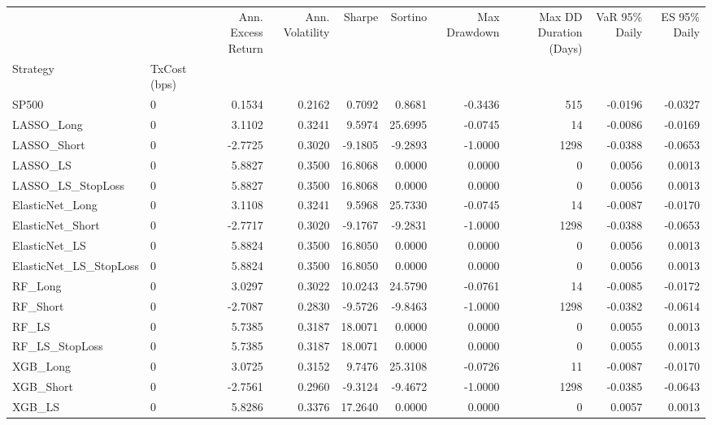 \begin{tabular}{llrrrrrrrr}
\toprule
 &  & Ann. Excess Return & Ann. Volatility & Sharpe & Sortino & Max Drawdown & Max DD Duration (Days) & VaR 95\% Daily & ES 95\% Daily \\
Strategy & TxCost (bps) &  &  &  &  &  &  &  &  \\
\midrule
SP500 & 0 & 0.1534 & 0.2162 & 0.7092 & 0.8681 & -0.3436 & 515 & -0.0196 & -0.0327 \\
\cline{1-10}
LASSO\_Long & 0 & 3.1102 & 0.3241 & 9.5974 & 25.6995 & -0.0745 & 14 & -0.0086 & -0.0169 \\
\cline{1-10}
LASSO\_Short & 0 & -2.7725 & 0.3020 & -9.1805 & -9.2893 & -1.0000 & 1298 & -0.0388 & -0.0653 \\
\cline{1-10}
LASSO\_LS & 0 & 5.8827 & 0.3500 & 16.8068 & 0.0000 & 0.0000 & 0 & 0.0056 & 0.0013 \\
\cline{1-10}
LASSO\_LS\_StopLoss & 0 & 5.8827 & 0.3500 & 16.8068 & 0.0000 & 0.0000 & 0 & 0.0056 & 0.0013 \\
\cline{1-10}
ElasticNet\_Long & 0 & 3.1108 & 0.3241 & 9.5968 & 25.7330 & -0.0745 & 14 & -0.0087 & -0.0170 \\
\cline{1-10}
ElasticNet\_Short & 0 & -2.7717 & 0.3020 & -9.1767 & -9.2831 & -1.0000 & 1298 & -0.0388 & -0.0653 \\
\cline{1-10}
ElasticNet\_LS & 0 & 5.8824 & 0.3500 & 16.8050 & 0.0000 & 0.0000 & 0 & 0.0056 & 0.0013 \\
\cline{1-10}
ElasticNet\_LS\_StopLoss & 0 & 5.8824 & 0.3500 & 16.8050 & 0.0000 & 0.0000 & 0 & 0.0056 & 0.0013 \\
\cline{1-10}
RF\_Long & 0 & 3.0297 & 0.3022 & 10.0243 & 24.5790 & -0.0761 & 14 & -0.0085 & -0.0172 \\
\cline{1-10}
RF\_Short & 0 & -2.7087 & 0.2830 & -9.5726 & -9.8463 & -1.0000 & 1298 & -0.0382 & -0.0614 \\
\cline{1-10}
RF\_LS & 0 & 5.7385 & 0.3187 & 18.0071 & 0.0000 & 0.0000 & 0 & 0.0055 & 0.0013 \\
\cline{1-10}
RF\_LS\_StopLoss & 0 & 5.7385 & 0.3187 & 18.0071 & 0.0000 & 0.0000 & 0 & 0.0055 & 0.0013 \\
\cline{1-10}
XGB\_Long & 0 & 3.0725 & 0.3152 & 9.7476 & 25.3108 & -0.0726 & 11 & -0.0087 & -0.0170 \\
\cline{1-10}
XGB\_Short & 0 & -2.7561 & 0.2960 & -9.3124 & -9.4672 & -1.0000 & 1298 & -0.0385 & -0.0643 \\
\cline{1-10}
XGB\_LS & 0 & 5.8286 & 0.3376 & 17.2640 & 0.0000 & 0.0000 & 0 & 0.0057 & 0.0013 \\

\end{tabular}

